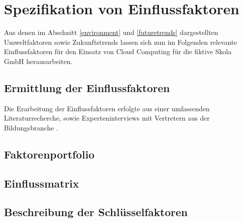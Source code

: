 \section{Spezifikation von Einflussfaktoren}
\label{influencingfactors}

Aus denen im Abschnitt \ref{environment} und \ref{futuretrends} dargestellten Umweltfaktoren sowie Zukunftstrends lassen sich nun im Folgenden relevante Einflussfaktoren für den Einsatz von Cloud Computing für die fiktive Skola GmbH herausarbeiten.

\subsection{Ermittlung der Einflussfaktoren}

Die Erarbeitung der Einflussfaktoren erfolgte aus einer umfassenden Literaturrecherche, sowie Experteninterviews mit Vertretern aus der Bildungsbranche .

\subsection{Faktorenportfolio}

\subsection{Einflussmatrix}

\subsection{Beschreibung der Schlüsselfaktoren}